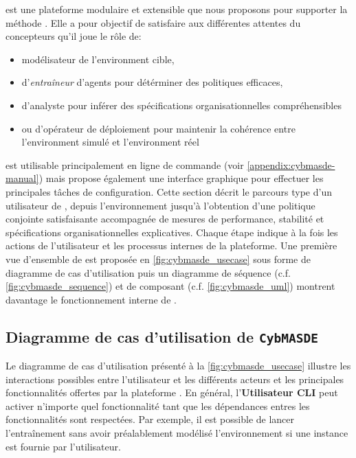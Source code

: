 \footnotemark[1] est une plateforme modulaire et extensible que nous proposons pour supporter la méthode . Elle a pour objectif de satisfaire aux différentes attentes du concepteurs qu'il joue le rôle de:
%
\begin{itemize}
  \item modélisateur de l'environment cible,
  \item d'\textit{entraîneur} d'agents pour détérminer des politiques efficaces,
  \item  d'analyste pour inférer des spécifications organisationnelles compréhensibles
  \item ou d'opérateur de déploiement pour maintenir la cohérence entre l'environment simulé et l'environment réel
\end{itemize}

 est utilisable principalement en ligne de commande (voir \autoref{appendix:cybmasde-manual}) mais propose également une interface graphique pour effectuer les principales tâches de configuration.
Cette section décrit le parcours type d'un utilisateur de , depuis l'environnement jusqu'à l'obtention d'une politique conjointe satisfaisante accompagnée de mesures de performance, stabilité et spécifications organisationnelles explicatives. Chaque étape indique à la fois les actions de l'utilisateur et les processus internes de la plateforme. Une première vue d'ensemble de  est proposée en \autoref{fig:cybmasde_usecase} sous forme de diagramme de cas d'utilisation puis un diagramme de séquence (c.f. \autoref{fig:cybmasde_sequence}) et de composant (c.f. \autoref{fig:cybmasde_uml}) montrent davantage le fonctionnement interne de .

\subsection{Diagramme de cas d'utilisation de \texttt{CybMASDE}}

Le diagramme de cas d'utilisation présenté à la \autoref{fig:cybmasde_usecase} illustre les interactions possibles entre l'utilisateur et les différents acteurs et les principales fonctionnalités offertes par la plateforme .
En général, l'\textbf{Utilisateur CLI} peut activer n'importe quel fonctionnalité tant que les dépendances entres les fonctionnalités sont respectées. Par exemple, il est possible de lancer l'entraînement sans avoir préalablement modélisé l'environnement si une instance  est fournie par l'utilisateur.

